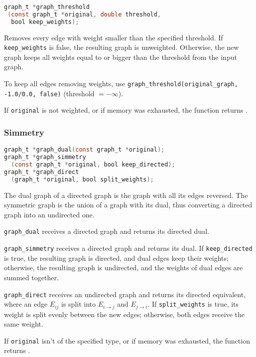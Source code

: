 \begin{lstlisting}[language=C,frame=single]
graph_t *graph_threshold
 (const graph_t *original, double threshold, 
  bool keep_weights);
\end{lstlisting}

  Removes every edge with weight smaller than the specified threshold. If \texttt{keep\_weights} is false, the resulting graph is unweighted.
  Otherwise, the new graph keeps all weights equal to or bigger than the threshold from the input graph.
  
  To keep all edges removing weights, use \lstinline!graph_threshold(original_graph, -1.0/0.0, false)! (threshold $= -\infty$).
  
  If \lstinline!original! is not weighted, or if memory was exhausted, the function returns \NULL.

\subsubsection{Simmetry}

\begin{lstlisting}[language=C,frame=single]
graph_t *graph_dual(const graph_t *original);
graph_t *graph_simmetry
  (const graph_t *original, bool keep_directed);
graph_t *graph_direct
  (graph_t *original, bool split_weights);
\end{lstlisting}

  The dual graph of a directed graph is the graph with all its edges reversed. The symmetric graph is the union of a graph with its dual, thus 
  converting a directed graph into an undirected one. 
  
  \lstinline!graph_dual! receives a directed graph and returns its directed dual. 
  
  \lstinline!graph_simmetry! receives a directed graph and returns its dual. If \lstinline!keep_directed! is true, the resulting graph is directed, and
  dual edges keep their weights; otherwise, the resulting graph is undirected, and the weights of dual edges are summed together.
  
  \lstinline!graph_direct! receives an undirected graph and returns its directed equivalent, where an edge $E_{ij}$ is split into $E_{i\to j}$ and $E_{j \to i}$.
  If \lstinline!split_weights! is true, its weight is split evenly between the new edges; otherwise, both edges receive the same weight.
  
  If \lstinline!original! isn't of the specified type, or if memory was exhausted, the function returns \NULL.

